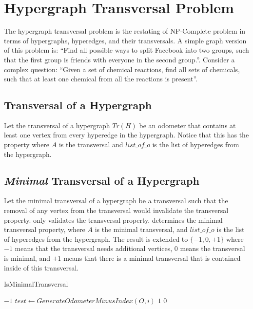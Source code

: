 


















\chapter{Hypergraph Transversal Problem}
The hypergraph transversal problem is the restating of NP-Complete problem in terms of hypergraphs, hyperedges, and their transversals. A simple graph version of this problem is: ``Find all possible ways to split Facebook into two groups, such that the first group is friends with everyone in the second group.''. Consider a complex question: ``Given a set of chemical reactions, find all sets of chemicals, such that at least one chemical from all the reactions is present''.

\section{Transversal of a Hypergraph}
Let the transversal of a hypergraph $Tr(H)$ be an odometer that contains at least one vertex from every hyperedge in the hypergraph. Notice that this has the property  where $A$ is the transversal and $list\_of\_o$ is the list of hyperedges from the hypergraph. 

\section{\emph{Minimal} Transversal of a Hypergraph}
Let the minimal transversal of a hypergraph be a transversal such that the removal of any vertex from the transversal would invalidate the transversal property.  only validates the transversal property.  determines the minimal transversal property, where $A$ is the minimal transversal, and $list\_of\_o$ is the list of hyperedges from the hypergraph. The result is extended to $\{-1,0,+1\}$ where $-1$ means that the transversal needs additional vertices, $0$ means the transversal is minimal, and $+1$ means that there is a minimal transversal that is contained inside of this transversal. 

\begin{algorithm}[H]
    \centering
	\caption{IsMinimalTransversal}\label{IsMinimalTransversal}
	\begin{algorithmic}[1]
		\State \Return $-1$
		\EndIf
		\State $test \gets GenerateOdometerMinusIndex(O,i)$
		\State \Return $1$
		\EndIf
		\EndFor
		\State \Return $0$
		\EndFunction
	\end{algorithmic}
\end{algorithm}
